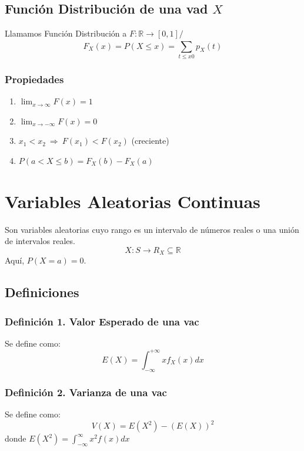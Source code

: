 \documentclass{article}
\newcommand{\tq}{/\,}                                   %
\newcommand{\reales}{\mathbb{R}}                        %
\newcommand{\Rightarrows}{\: \Rightarrow \:}            %
\newcommand{\sumatoria}[2]{\sum_{#1} ^{#2}}
\begin{document}
\subsection{Función Distribución de una vad $X$}
Llamamos Función Distribución a $F: \reales \rightarrow [0,1] \tq$
\begin{equation*}
    F_X(x) = P(X \leq x) = \sumatoria{t \leq x0}{} p_X(t)
\end{equation*}
\subsubsection*{Propiedades}
\begin{enumerate}
    \item $\lim_{x \rightarrow \infty} F(x) = 1$
    \item $\lim_{x \rightarrow -\infty} F(x) = 0$
    \item $x_1 < x_2 \Rightarrows F(x_1) < F(x_2)$ (creciente)
    \item $P(a < X \leq b) = F_X(b) - F_X(a)$
\end{enumerate}

\newpage
\section{Variables Aleatorias Continuas}
Son variables aleatorias cuyo rango es un intervalo de números reales o una unión de intervalos reales.
\begin{equation*}
    X: S \rightarrow R_X \subseteq \reales
\end{equation*}
Aquí, $P(X = a) = 0$.
\subsection{Definiciones}
\subsubsection*{Definición 1. Valor Esperado de una vac}
Se define como: 
\begin{equation*}
    E(X) = \int_{-\infty}^{+\infty} xf_X(x) dx
\end{equation*}

\subsubsection*{Definición 2. Varianza de una vac}
Se define como:
\begin{equation*}
    V(X) = E(X^2) - (E(X))^2
\end{equation*}
donde $E(X^2) = \int^{\infty}_{-\infty} x^2 f(x) dx$
\end{document}
